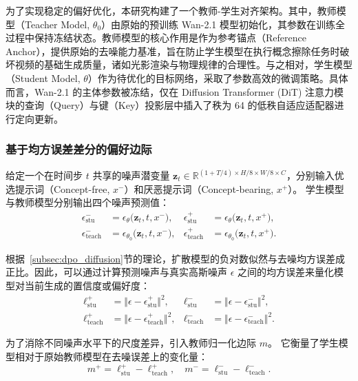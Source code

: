 为了实现稳定的偏好优化，本研究构建了一个教师-学生对齐架构。其中，教师模型（Teacher Model, $\theta_0$）由原始的预训练 Wan-2.1 模型初始化，其参数在训练全过程中保持冻结状态。教师模型的核心作用是作为参考锚点（Reference Anchor），提供原始的去噪能力基准，旨在防止学生模型在执行概念擦除任务时破坏视频的基础生成质量，诸如光影渲染与物理规律的合理性。与之相对，学生模型（Student Model, $\theta$）作为待优化的目标网络，采取了参数高效的微调策略。具体而言，Wan-2.1 的主体参数被冻结，仅在 Diffusion Transformer (DiT) 注意力模块的查询（Query）与键（Key）投影层中插入了秩为 64 的低秩自适应适配器进行定向更新。

\subsubsection{基于均方误差差分的偏好边际}
给定一个在时间步 $t$ 共享的噪声潜变量 $\mathbf{z}_t \in \mathbb{R}^{(1+T/4)\times H/8\times W/8\times C}$，分别输入优选提示词（Concept-free, $x^-$）和厌恶提示词（Concept-bearing, $x^+$）。
学生模型与教师模型分别输出四个噪声预测值：
\begin{align}
    \epsilon^{-}_{\text{stu}}    &= \epsilon_{\theta}\bigl(\mathbf{z}_t,t,x^{-}\bigr), &\epsilon^{+}_{\text{stu}}    &= \epsilon_{\theta}\bigl(\mathbf{z}_t,t,x^{+}\bigr), \\
    \epsilon^{-}_{\text{teach}} &= \epsilon_{\theta_{0}}\bigl(\mathbf{z}_t,t,x^{-}\bigr), &\epsilon^{+}_{\text{teach}} &= \epsilon_{\theta_{0}}\bigl(\mathbf{z}_t,t,x^{+}\bigr).
\end{align}

根据~\ref{subsec:dpo_diffusion}节的理论，扩散模型的负对数似然与去噪均方误差成正比。因此，可以通过计算预测噪声与真实高斯噪声 $\epsilon$ 之间的均方误差来量化模型对当前生成的置信度或偏好度：
\begin{align}
    \ell^{+}_{\text{stu}}    &= \Vert \epsilon - \epsilon^{+}_{\text{stu}}    \Vert^2, &\ell^{-}_{\text{stu}}    &= \Vert \epsilon - \epsilon^{-}_{\text{stu}}    \Vert^2, \\
    \ell^{+}_{\text{teach}} &= \Vert \epsilon - \epsilon^{+}_{\text{teach}} \Vert^2, &\ell^{-}_{\text{teach}} &= \Vert \epsilon - \epsilon^{-}_{\text{teach}} \Vert^2.
\end{align}

为了消除不同噪声水平下的尺度差异，引入教师归一化边际 $m$。
它衡量了学生模型相对于原始教师模型在去噪误差上的变化量：
\begin{equation}
    m^{+}=\ell_{\text{stu}}^{+}-\ell_{\text{teach}}^{+},\quad m^{-}=\ell_{\text{stu}}^{-}-\ell_{\text{teach}}^{-}.
\end{equation}

